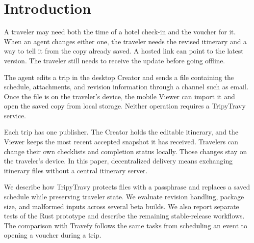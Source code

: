 \section{Introduction}
A traveler may need both the time of a hotel check-in and the voucher for it. When an agent changes either one, the traveler needs the revised itinerary and a way to tell it from the copy already saved. A hosted link can point to the latest version. The traveler still needs to receive the update before going offline.

The agent edits a trip in the desktop Creator and sends a file containing the schedule, attachments, and revision information through a channel such as email. Once the file is on the traveler's device, the mobile Viewer can import it and open the saved copy from local storage. Neither operation requires a TripyTravy service.

Each trip has one publisher. The Creator holds the editable itinerary, and the Viewer keeps the most recent accepted snapshot it has received. Travelers can change their own checklists and completion status locally. Those changes stay on the traveler's device. In this paper, decentralized delivery means exchanging itinerary files without a central itinerary server.

We describe how TripyTravy protects files with a passphrase and replaces a saved schedule while preserving traveler state. We evaluate revision handling, package size, and malformed inputs across several beta builds. We also report separate tests of the Rust prototype and describe the remaining stable-release workflows. The comparison with Travefy follows the same tasks from scheduling an event to opening a voucher during a trip.
